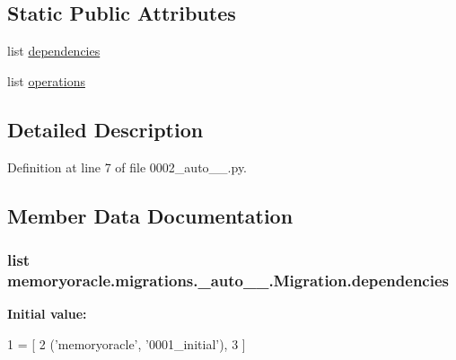 \subsection*{Static Public Attributes}
\begin{DoxyCompactItemize}
\item 
list \hyperlink{classmemoryoracle_1_1migrations_1_10002__auto__20150402__2000_1_1Migration_ad8bf82d78053e8a99e2061bd9c25f79e}{dependencies}
\item 
list \hyperlink{classmemoryoracle_1_1migrations_1_10002__auto__20150402__2000_1_1Migration_a6025e0caf46b0c277851adc0396a042a}{operations}
\end{DoxyCompactItemize}


\subsection{Detailed Description}


Definition at line 7 of file 0002\+\_\+auto\+\_\+\_.\+py.



\subsection{Member Data Documentation}
\hypertarget{classmemoryoracle_1_1migrations_1_10002__auto__20150402__2000_1_1Migration_ad8bf82d78053e8a99e2061bd9c25f79e}{}
\subsubsection[{dependencies}]{\setlength{\rightskip}{0pt plus 5cm}list memoryoracle.\+migrations.\+\_\+auto\+\_\+\_.\+Migration.\+dependencies\hspace{0.3cm}{\ttfamily [static]}}\label{classmemoryoracle_1_1migrations_1_10002__auto__20150402__2000_1_1Migration_ad8bf82d78053e8a99e2061bd9c25f79e}
{\bfseries Initial value\+:}
\begin{DoxyCode}
1 = [
2         (\textcolor{stringliteral}{'memoryoracle'}, \textcolor{stringliteral}{'0001\_initial'}),
3     ]
\end{DoxyCode}


